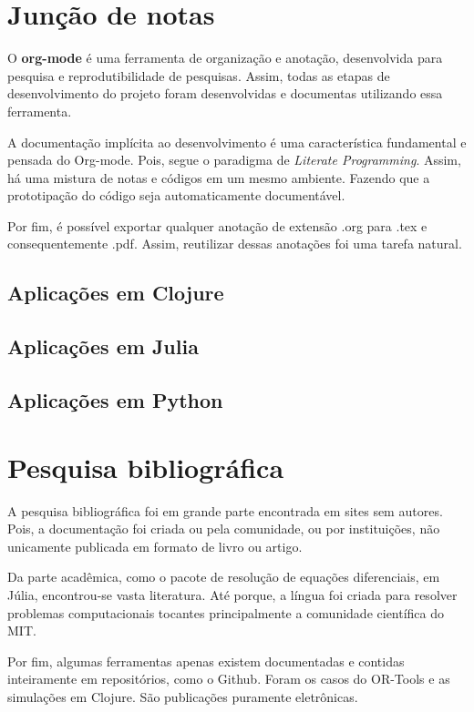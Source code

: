\documentclass[
12pt,				%
openright,			%
oneside,			%
a4paper,			%
english,			%
french,				%
spanish,			%
brazil,				%
]{abntex2}
\begin{document}
\section{Junção de notas}
O \textbf{org-mode} é uma ferramenta de organização e anotação, desenvolvida
para pesquisa e reprodutibilidade de pesquisas. Assim, todas as etapas
de desenvolvimento do projeto foram desenvolvidas e documentas utilizando
essa ferramenta.

A documentação implícita ao desenvolvimento é uma
característica fundamental e pensada do Org-mode. Pois, segue o
paradigma de \textit{Literate Programming}. Assim, há uma mistura de
notas e códigos em um mesmo ambiente. Fazendo que a prototipação do
código seja automaticamente documentável.

Por fim, é possível exportar qualquer anotação de extensão .org para
.tex e consequentemente .pdf. Assim, reutilizar dessas anotações foi
uma tarefa natural.

\subsection{Aplicações em Clojure}

\subsection{Aplicações em Julia}
\subsection{Aplicações em Python}

\section{Pesquisa bibliográfica}
A pesquisa bibliográfica foi em grande parte encontrada em sites sem
autores. Pois, a documentação foi criada ou pela comunidade, ou por
instituições, não unicamente publicada em formato de livro ou artigo.

Da parte acadêmica, como o pacote de resolução de equações
diferenciais, em Júlia, encontrou-se vasta literatura. Até porque, a
língua foi criada para resolver problemas computacionais tocantes
principalmente a comunidade científica do MIT.

Por fim, algumas ferramentas apenas existem documentadas e contidas
inteiramente em repositórios, como o Github. Foram os casos do
OR-Tools e as simulações em Clojure. São publicações puramente eletrônicas.
\end{document}
